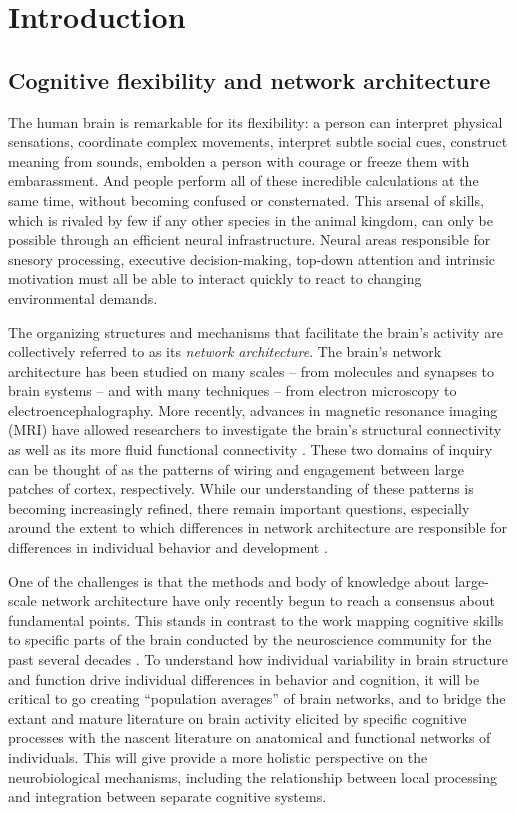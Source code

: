 \chapter{Introduction}

\section{Cognitive flexibility and network architecture}

The human brain is remarkable for its flexibility: a person can interpret physical sensations, coordinate complex movements, interpret subtle social cues, construct meaning from sounds, embolden a person with courage or freeze them with embarassment. And people perform all of these incredible calculations at the same time, without becoming confused or consternated. This arsenal of skills, which is rivaled by few if any other species in the animal kingdom, can only be possible through an efficient neural infrastructure. Neural areas responsible for snesory processing, executive decision-making, top-down attention and intrinsic motivation must all be able to interact quickly to react to changing environmental demands. 

The organizing structures and mechanisms that facilitate the brain's activity are collectively referred to as its \textit{network architecture}. The brain's network architecture has been studied on many scales -- from molecules and synapses to brain systems -- and with many techniques -- from electron microscopy to electroencephalography. More recently, advances in magnetic resonance imaging (MRI) have allowed researchers to investigate the brain's structural connectivity as well as its more fluid functional connectivity \citep{Betzel2013}. These two domains of inquiry can be thought of as the patterns of wiring and engagement between large patches of cortex, respectively. While our understanding of these patterns is becoming increasingly refined, there remain important questions, especially around the extent to which differences in network architecture are responsible for differences in individual behavior and development \citep{Petersen2015}.

One of the challenges is that the methods and body of knowledge about large-scale network architecture have only recently begun to reach a consensus about fundamental points. This stands in contrast to the work mapping cognitive skills to specific parts of the brain conducted by the neuroscience community for the past several decades \citep{Yarkoni2011}. To understand how individual variability in brain structure and function drive individual differences in behavior and cognition, it will be critical to go creating ``population averages'' of brain networks, and to bridge the extant and mature literature on brain activity elicited by specific cognitive processes with the nascent literature on anatomical and functional networks of individuals. This will give provide a more holistic perspective on the neurobiological mechanisms, including the relationship between local processing and integration between separate cognitive systems. 

